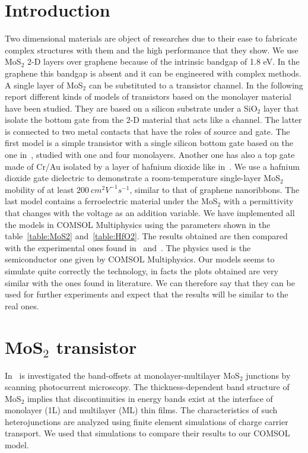\documentclass[12pt,a4paper,titlepage]{article}
\begin{document}
\section{Introduction}
Two dimensional materials are object of researches due to their ease to fabricate complex structures with them and the high performance that they show.
We use MoS$_2$ 2-D layers over graphene because of the intrinsic bandgap of 1.8 eV. In the graphene this bandgap is absent and it can be engineered with complex methods.
A single layer of MoS$_2$ can be substituted to a transistor channel.
In the following report different kinds of models of transistors based on the monolayer material have been studied.
They are based on a silicon substrate under a SiO$_2$ layer that isolate the bottom gate from the 2-D material that acts like a channel. The latter is connected to two metal contacts that have the roles of source and gate.
The first model is a simple transistor with a single silicon bottom gate based on the one in~\cite{Howell:MonolayerMultiLayer_MoS2}, studied with one and four monolayers.
Another one has also a top gate made of Cr/Au isolated by a layer of hafnium dioxide like in~\cite{Radisavljevic:Si_MoS2}.
We use a hafnium dioxide gate dielectric to demonstrate a room-temperature single-layer MoS$_2$ mobility of at least $200~cm^2 V^{-1} s^{-1}$, similar to that of graphene nanoribbons.
The last model contains a ferroelectric material under the MoS$_2$ with a permittivity that changes with the voltage as an addition variable.
We have implemented all the models in COMSOL Multiphysics using the parameters shown in the table~\ref{table:MoS2} and~\ref{table:HfO2}. The results obtained are then compared with the experimental ones found in~\cite{Howell:MonolayerMultiLayer_MoS2} and~\cite{Radisavljevic:Si_MoS2}. The physics used is the semiconductor one given by COMSOL Multiphysics.
Our models seems to simulate quite correctly the technology, in facts the plots obtained are very similar with the ones found in literature.
We can therefore say that they can be used for further experiments and expect that the results will be similar to the real ones.

\newpage
\section{MoS$_2$ transistor}

In~\cite{Howell:MonolayerMultiLayer_MoS2} is investigated the band-offsets at monolayer-multilayer MoS$_2$ junctions by scanning photocurrent microscopy. The thickness-dependent band structure of MoS$_2$ implies that discontinuities in energy bands exist at the interface of monolayer (1L) and multilayer (ML) thin films. The characteristics of such heterojunctions are analyzed using finite element simulations of charge carrier transport. We used that simulations to compare their results to our COMSOL model.
\end{document}
